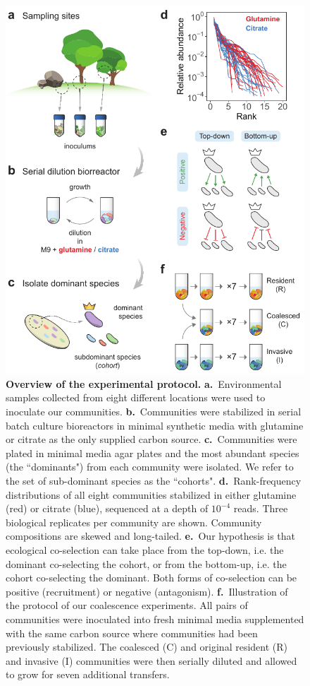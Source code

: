 \documentclass[a4paper,10pt]{article}
\begin{document}
\begin{figure}[!h]
\centering
\internallinenumbers
\includegraphics[scale=0.7,keepaspectratio]{figs/fig1.pdf}
\caption{\textbf{Overview of the experimental protocol.}
\textbf{a.}~Environmental samples collected from eight different locations were used
to inoculate our communities.
\textbf{b.}~Communities were stabilized in serial batch culture bioreactors
\cite{Goldford2018} in minimal synthetic media with glutamine or citrate as the
only supplied carbon source.
\textbf{c.}~Communities were plated in minimal media agar plates and the most abundant
species (the ``dominants") from each community were isolated. We refer to the set of
sub-dominant species as the ``cohorts".
\textbf{d.}~Rank-frequency distributions of all eight communities stabilized in either
glutamine (red) or citrate (blue), sequenced at a depth of $10^{-4}$ reads.
Three biological replicates per community are shown.
Community compositions are skewed and long-tailed.
\textbf{e.}~Our hypothesis is that ecological co-selection can take place from the top-down,
i.e. the dominant co-selecting the cohort, or from the bottom-up, i.e. the cohort co-selecting
the dominant. Both forms of co-selection can be positive (recruitment) or negative
(antagonism).
\textbf{f.}~Illustration of the protocol of our coalescence experiments. All pairs of
communities were inoculated into fresh minimal media supplemented with the same carbon
source where communities had been previously stabilized. The coalesced (C) and original
resident (R) and invasive (I) communities were then serially diluted and allowed to grow
for seven additional transfers.}
\label{fig1}
\end{figure}
\end{document}
